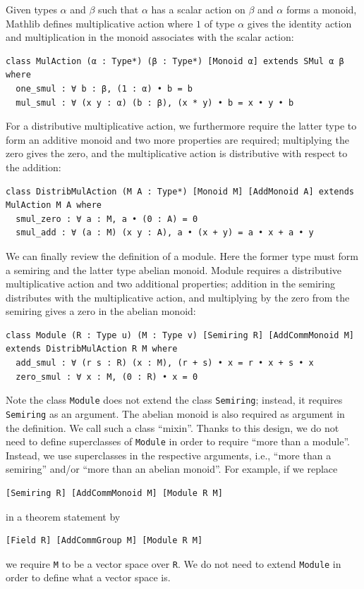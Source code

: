 \documentclass[]{article}
\renewcommand{\.}{\hskip .75pt}
\begin{document}
Given types $\alpha$ and $\beta$ such that $\alpha$ has a scalar action on $\beta$
and $\alpha$ forms a monoid, Mathlib defines multiplicative action where
$1$ of type $\alpha$ gives the identity action and multiplication in the monoid
associates with the scalar action:
\begin{lstlisting}
class MulAction (α : Type*) (β : Type*) [Monoid α] extends SMul α β where
  one_smul : ∀ b : β, (1 : α) • b = b
  mul_smul : ∀ (x y : α) (b : β), (x * y) • b = x • y • b
\end{lstlisting}
For a distributive multiplicative action, we furthermore require the latter type
to form an additive monoid and two more properties are required; multiplying the zero
gives the zero, and the multiplicative action is distributive with respect to the addition:
\begin{lstlisting}
class DistribMulAction (M A : Type*) [Monoid M] [AddMonoid A] extends MulAction M A where
  smul_zero : ∀ a : M, a • (0 : A) = 0
  smul_add : ∀ (a : M) (x y : A), a • (x + y) = a • x + a • y
\end{lstlisting}
We can finally review the definition of a module. Here the former type must form a semiring
and the latter type abelian monoid. Module requires a distributive multiplicative action and
two additional properties; addition in the semiring distributes with the multiplicative action,
and multiplying by the zero from the semiring gives a zero in the abelian monoid:
\begin{lstlisting}
class Module (R : Type u) (M : Type v) [Semiring R] [AddCommMonoid M] extends DistribMulAction R M where
  add_smul : ∀ (r s : R) (x : M), (r + s) • x = r • x + s • x
  zero_smul : ∀ x : M, (0 : R) • x = 0
\end{lstlisting}
Note the class \texttt{Module} does not extend the class \texttt{Semiring}; instead,
it requires \texttt{Semiring} as an argument.
The abelian monoid is also required as argument in the definition. We call such a class ``mixin''.
Thanks to this design, we do not need to define superclasses of \texttt{Module} in order to require
``more than a module''. Instead, we use superclasses in the respective arguments, i.e.,
``more than a semiring'' and/or ``more than an abelian monoid''. For example, if we replace
\begin{lstlisting}
[Semiring R] [AddCommMonoid M] [Module R M]
\end{lstlisting}
in a theorem statement by
\begin{lstlisting}
[Field R] [AddCommGroup M] [Module R M]
\end{lstlisting}
we require \texttt{M} to be a vector space over \texttt{R}. We do not need to extend
\texttt{Module} in order to define what a vector space is.
\end{document}
